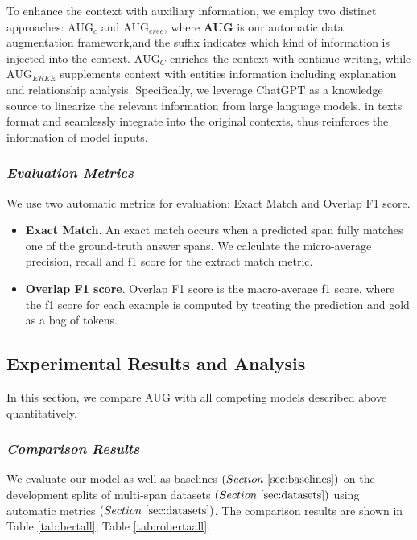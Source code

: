 \documentclass[a4paper,fleqn]{cas-dc}
\newcommand{\1}[1]{\mathds{1}\left[#1\right]}
\begin{document}
	To enhance the context with auxiliary information, we employ two distinct   approaches: \textbf{$\text{AUG}_{c}$} and \textbf{$\text{AUG}_{eree}$}, where \textbf{AUG} is our automatic data augmentation framework,and the suffix indicates which kind of information is injected into the context. \textbf{$\text{AUG}_{C}$} enriches the context with continue writing, while \textbf{$\text{AUG}_{EREE}$} supplements context with entities information including explanation and relationship analysis.
	Specifically, we leverage ChatGPT as a knowledge source to linearize the relevant information from large language models. in texts format and seamlessly integrate into the original contexts, thus reinforces the information of model inputs.

	
	\subsubsection{\textit{Evaluation Metrics}}
	\label{sec:metrics}
	We use two automatic metrics for evaluation: Exact Match and Overlap F1 score.
	\begin{itemize}
		\item \textbf{Exact Match}. An exact match occurs when a predicted span fully matches one of the ground-truth
		answer spans. We calculate the micro-average precision, recall and f1 score for the extract match
		metric.
		
		\item \textbf{Overlap F1 score}. Overlap F1 score is the macro-average f1 score, where the f1 score for each
		example is computed by treating the prediction and gold as a bag of tokens.
	\end{itemize}

\subsection{Experimental Results and Analysis}
	In this section, we compare $\text{AUG}$ with all competing models described above quantitatively.
	
	\subsubsection{\textit{Comparison Results}}
	We evaluate our model as well as baselines 
	\(( Section ~\ref{sec:baselines} )\) on the development splits of multi-span datasets \(( Section  ~\ref{sec:datasets})\) using automatic metrics \(( Section ~\ref{sec:datasets})\). The comparison results are shown in Table \ref{tab:bertall}, Table \ref{tab:robertaall}.
	
\end{document}
